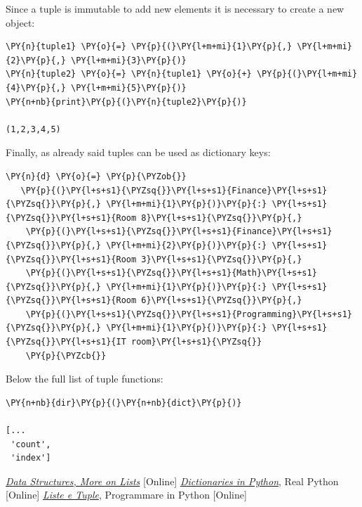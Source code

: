 Since a tuple is immutable to add new elements it is necessary to create a new object:

\begin{tcolorbox}[breakable, size=fbox, boxrule=1pt, pad at break*=1mm, colback=cellbackground, colframe=cellborder]\begin{Verbatim}[commandchars=\\\{\}]
\PY{n}{tuple1} \PY{o}{=} \PY{p}{(}\PY{l+m+mi}{1}\PY{p}{,} \PY{l+m+mi}{2}\PY{p}{,} \PY{l+m+mi}{3}\PY{p}{)}
\PY{n}{tuple2} \PY{o}{=} \PY{n}{tuple1} \PY{o}{+} \PY{p}{(}\PY{l+m+mi}{4}\PY{p}{,} \PY{l+m+mi}{5}\PY{p}{)}
\PY{n+nb}{print}\PY{p}{(}\PY{n}{tuple2}\PY{p}{)}

(1,2,3,4,5)
\end{Verbatim}
\end{tcolorbox}

Finally, as already said tuples can be used as dictionary keys:

\begin{tcolorbox}[breakable, size=fbox, boxrule=1pt, pad at break*=1mm, colback=cellbackground, colframe=cellborder]\begin{Verbatim}[commandchars=\\\{\}]
\PY{n}{d} \PY{o}{=} \PY{p}{\PYZob{}}
   \PY{p}{(}\PY{l+s+s1}{\PYZsq{}}\PY{l+s+s1}{Finance}\PY{l+s+s1}{\PYZsq{}}\PY{p}{,} \PY{l+m+mi}{1}\PY{p}{)}\PY{p}{:} \PY{l+s+s1}{\PYZsq{}}\PY{l+s+s1}{Room 8}\PY{l+s+s1}{\PYZsq{}}\PY{p}{,}
    \PY{p}{(}\PY{l+s+s1}{\PYZsq{}}\PY{l+s+s1}{Finance}\PY{l+s+s1}{\PYZsq{}}\PY{p}{,} \PY{l+m+mi}{2}\PY{p}{)}\PY{p}{:} \PY{l+s+s1}{\PYZsq{}}\PY{l+s+s1}{Room 3}\PY{l+s+s1}{\PYZsq{}}\PY{p}{,}
    \PY{p}{(}\PY{l+s+s1}{\PYZsq{}}\PY{l+s+s1}{Math}\PY{l+s+s1}{\PYZsq{}}\PY{p}{,} \PY{l+m+mi}{1}\PY{p}{)}\PY{p}{:} \PY{l+s+s1}{\PYZsq{}}\PY{l+s+s1}{Room 6}\PY{l+s+s1}{\PYZsq{}}\PY{p}{,}
    \PY{p}{(}\PY{l+s+s1}{\PYZsq{}}\PY{l+s+s1}{Programming}\PY{l+s+s1}{\PYZsq{}}\PY{p}{,} \PY{l+m+mi}{1}\PY{p}{)}\PY{p}{:} \PY{l+s+s1}{\PYZsq{}}\PY{l+s+s1}{IT room}\PY{l+s+s1}{\PYZsq{}}
    \PY{p}{\PYZcb{}}
\end{Verbatim}
\end{tcolorbox}

Below the full list of tuple functions:
\begin{tcolorbox}[breakable, size=fbox, boxrule=1pt, pad at break*=1mm,colback=cellbackground, colframe=cellborder]
\begin{Verbatim}[commandchars=\\\{\}]
\PY{n+nb}{dir}\PY{p}{(}\PY{n+nb}{dict}\PY{p}{)}

[...
 'count',
 'index']
\end{Verbatim}
\end{tcolorbox}

\begin{thebibliography}{9}
 \href{https://docs.python.org/3/tutorial/datastructures.html}{\emph{Data Structures, More on Lists}} [Online]
 \href{https://realpython.com/python-dicts/}{\emph{Dictionaries in Python}}, Real Python [Online]
 \href{https://www.programmareinpython.it/video-corso-python-base/14-liste-e-tuple/}{\emph{Liste e Tuple}}, Programmare in Python [Online]
\end{thebibliography}

